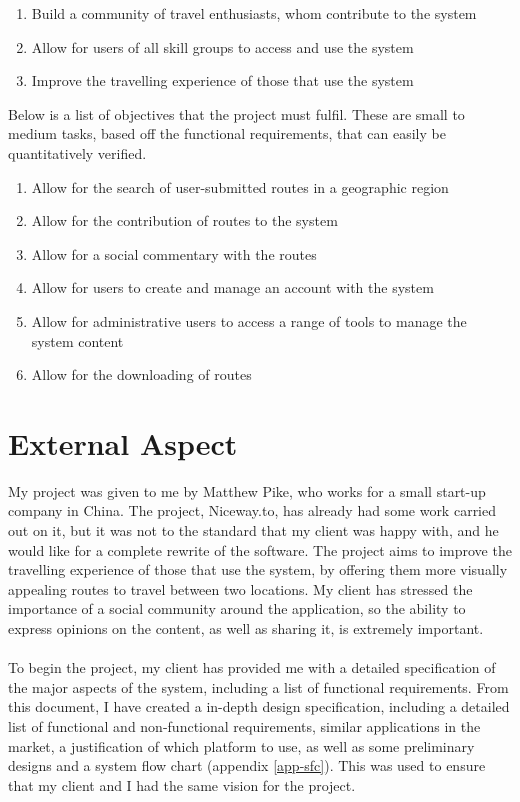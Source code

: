 \documentclass[a4paper,twoside,notitlepage,11pt]{article}
\begin{document}
\begin{enumerate}
	\item Build a community of travel enthusiasts, whom contribute to the system
	\item Allow for users of all skill groups to access and use the system
	\item Improve the travelling experience of those that use the system
\end{enumerate}
\noindent
Below is a list of objectives that the project must fulfil. These are small to medium tasks, based off the functional requirements, that can easily be quantitatively verified.

\begin{enumerate}
	\item Allow for the search of user-submitted routes in a geographic region
	\item Allow for the contribution of routes to the system
	\item Allow for a social commentary with the routes
	\item Allow for users to create and manage an account with the system
	\item Allow for administrative users to access a range of tools to manage the system content
	\item Allow for the downloading of routes
\end{enumerate}

\section{External Aspect}
My project was given to me by Matthew Pike, who works for a small start-up company in China. The project, Niceway.to, has already had some work carried out on it, but it was not to the standard that my client was happy with, and he would like for a complete rewrite of the software. The project aims to improve the travelling experience of those that use the system, by offering them more visually appealing routes to travel between two locations. My client has stressed the importance of a social community around the application, so the ability to express opinions on the content, as well as sharing it, is extremely important.\ \\
\ \\
To begin the project, my client has provided me with a detailed specification of the major aspects of the system, including a list of functional requirements. From this document, I have created a in-depth design specification, including a detailed list of functional and non-functional requirements, similar applications in the market, a justification of which platform to use, as well as some preliminary designs and a system flow chart (appendix \ref{app-sfc}). This was used to ensure that my client and I had the same vision for the project.\ \\
\end{document}
